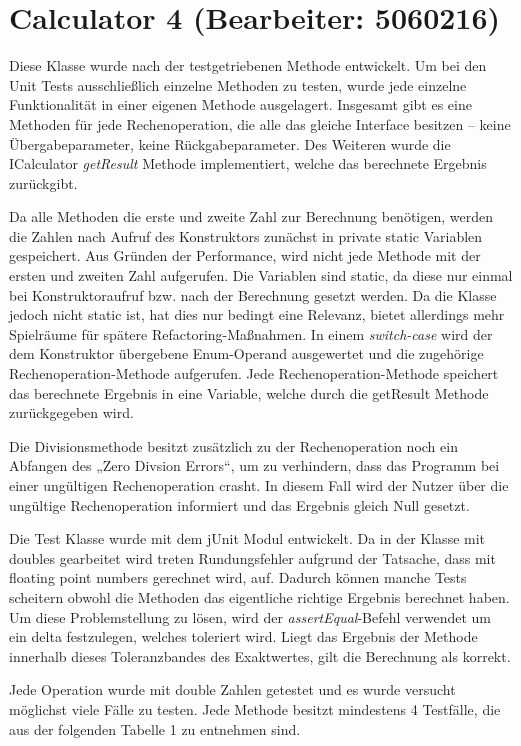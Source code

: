 \chapter{Calculator 4 (Bearbeiter: 5060216)}

Diese Klasse wurde nach der testgetriebenen Methode entwickelt. Um bei den Unit Tests ausschließlich einzelne Methoden zu testen, wurde jede einzelne Funktionalität in einer eigenen Methode ausgelagert. Insgesamt gibt es eine Methoden für jede Rechenoperation, die alle das gleiche Interface besitzen – keine Übergabeparameter, keine Rückgabeparameter. Des Weiteren wurde die ICalculator \textit{getResult} Methode implementiert, welche das berechnete Ergebnis zurückgibt.

Da alle Methoden die erste und zweite Zahl zur Berechnung benötigen, werden die Zahlen nach Aufruf des Konstruktors zunächst in private static Variablen gespeichert. Aus Gründen der Performance, wird nicht jede Methode mit der ersten und zweiten Zahl aufgerufen. Die Variablen sind static, da diese nur einmal bei Konstruktoraufruf bzw. nach der Berechnung gesetzt werden. Da die Klasse jedoch nicht static ist, hat dies nur bedingt eine Relevanz, bietet allerdings mehr Spielräume für spätere Refactoring-Maßnahmen.
In einem \textit{switch-case} wird der dem Konstruktor übergebene Enum-Operand ausgewertet und die zugehörige Rechenoperation-Methode aufgerufen. Jede Rechenoperation-Methode speichert das berechnete Ergebnis in eine Variable, welche durch die getResult Methode zurückgegeben wird.

Die Divisionsmethode besitzt zusätzlich zu der Rechenoperation noch ein Abfangen des „Zero Divsion Errors“, um zu verhindern, dass das Programm bei einer ungültigen Rechenoperation crasht. In diesem Fall wird der Nutzer über die ungültige Rechenoperation informiert und das Ergebnis gleich Null gesetzt.

Die Test Klasse wurde mit dem jUnit Modul entwickelt. Da in der Klasse mit doubles gearbeitet wird treten Rundungsfehler aufgrund der Tatsache, dass mit floating point numbers gerechnet wird, auf. Dadurch können manche Tests scheitern obwohl die Methoden das eigentliche richtige Ergebnis berechnet haben. Um diese Problemstellung zu lösen, wird der \textit{assertEqual}-Befehl verwendet um ein delta festzulegen, welches toleriert wird. Liegt das Ergebnis der Methode innerhalb dieses Toleranzbandes des Exaktwertes, gilt die Berechnung als korrekt.

Jede Operation wurde mit double Zahlen getestet und es wurde versucht möglichst viele Fälle zu testen. Jede Methode besitzt mindestens 4 Testfälle, die aus der folgenden Tabelle 1 zu entnehmen sind.

